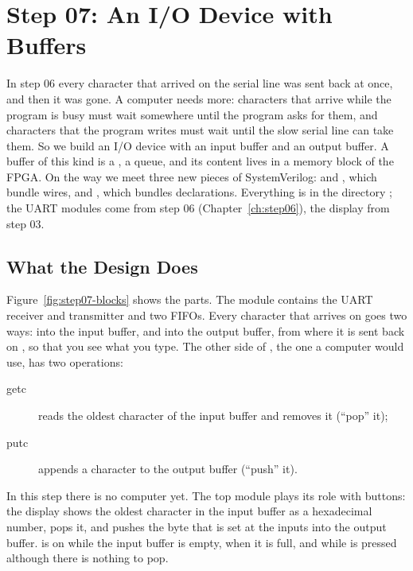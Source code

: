 \chapter{Step 07: An I/O Device with Buffers}
\label{ch:step07}

In step 06 every character that arrived on the serial line was sent back at
once, and then it was gone. A computer needs more: characters that arrive
while the program is busy must wait somewhere until the program asks for them,
and characters that the program writes must wait until the slow serial line
can take them. So we build an I/O device with an input buffer and an output
buffer. A buffer of this kind is a , a queue, and its content lives
in a memory block of the FPGA. On the way we meet three new pieces of
SystemVerilog:  and , which bundle wires, and
, which bundles declarations. Everything is in the directory
; the UART modules come from step 06
(Chapter~\ref{ch:step06}), the display from step 03.

\section{What the Design Does}
\label{sec:step07-design}

Figure~\ref{fig:step07-blocks} shows the parts. The module 
contains the UART receiver and transmitter and two FIFOs. Every character
that arrives on  goes two ways: into the input buffer, and into the
output buffer, from where it is sent back on , so that you see what you
type. The other side of , the one a computer would use, has two
operations:
\begin{description}
\item[getc] reads the oldest character of the input buffer and removes it
  (``pop'' it);
\item[putc] appends a character to the output buffer (``push'' it).
\end{description}
In this step there is no computer yet. The top module  plays its
role with buttons: the display shows the oldest character in the input buffer
as a hexadecimal number,  pops it, and  pushes the byte
that is set at the inputs  into the output buffer.  is on
while the input buffer is empty,  when it is full, and 
while  is pressed although there is nothing to pop.


